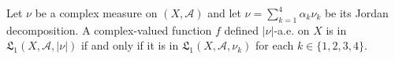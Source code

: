 Let $\nu$ be a complex measure on $(X, \mathcal{A})$ and let $\nu = \sum_{k=1}^{4} \alpha_k \nu_k$ be its Jordan decomposition. A complex-valued function $f$ defined $|\nu|$-a.e. on $X$ is in $\mathfrak{L}_1(X, \mathcal{A}, |\nu|)$ if and only if it is in $\mathfrak{L}_1(X, \mathcal{A}, \nu_k)$ for each $k \in \{1, 2, 3, 4\}$.